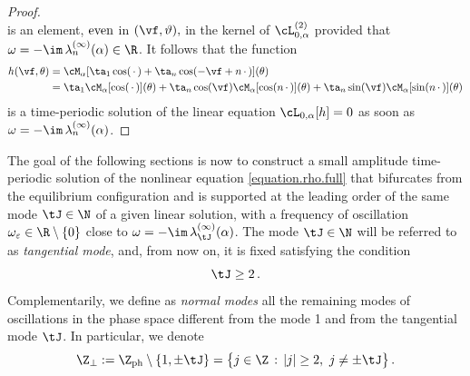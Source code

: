 \documentclass[a4paper,reqno,10pt]{article}
\begin{document}
\begin{proof}
\begin{equation}
\end{equation}
is an element, ${\rm even}$ in $(\vf,\vartheta),$ in the kernel of $\cL_{0,\alpha}^{(2)}$ provided that 
$\omega= -\im \,\lambda_{n}^{(\infty)}(\alpha) \in \R$. It follows that the function
\begin{equation}
	\begin{aligned}
		h(\vf,\theta) &= \cM_{\alpha}[\ta_{1}\cos(\,\cdot\,)+ \ta_{n} \cos(-\vf+n\,\cdot\,) ](\theta) \\
		& =\ta_{1}\cM_{\alpha}[\cos(\,\cdot\,)](\theta) +  \ta_{n}\cos(\vf) \cM_{\alpha}[\cos(n\,\cdot\,)](\theta)+ \ta_{n}\sin(\vf) \cM_{\alpha}[\sin(n\,\cdot\,)](\theta)
	\end{aligned}
\end{equation}
is a time-periodic solution of the linear equation $\cL_{0,\alpha}[h]=0$ as soon as $\omega = -\im\, \lambda_{n}^{(\infty)}(\alpha)$. 
\end{proof}
The goal of the following sections is now to construct a small amplitude time-periodic solution of the nonlinear equation \ref{equation.rho.full} that bifurcates from the equilibrium configuration and is supported at the leading order of the same mode $\tJ \in \N$ of a given linear solution, with a frequency of oscillation $\omega_{\varepsilon}\in\R\setminus\{0\}$ close to $\omega=-\im\,\lambda_{\tJ}^{(\infty)}(\alpha)$. The mode $\tJ\in\N$ will be referred to as {\it tangential mode}, and, from now on, it is fixed satisfying the condition
\begin{equation}\label{tangential.mode}
	\tJ \geq 2 \,.
\end{equation}
Complementarily, we define as {\it normal modes} all the remaining modes of oscillations in the phase space different from the mode 1 and from the tangential mode $\tJ$. In particular, we denote
\begin{equation}\label{Z.perp}
	\Z_{\perp} := \Z_{\rm ph} \setminus\{1,\pm \tJ\} = \big\{ j \in \Z \,:\, |j|\geq 2 , \ j\neq \pm \tJ \big\} \,.
\end{equation}
\end{document}

